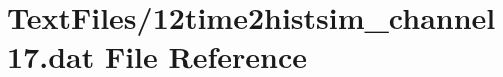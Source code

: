\hypertarget{12time2histsim__channel17_8dat}{}\section{Text\+Files/12time2histsim\+\_\+channel17.dat File Reference}
\label{12time2histsim__channel17_8dat}
